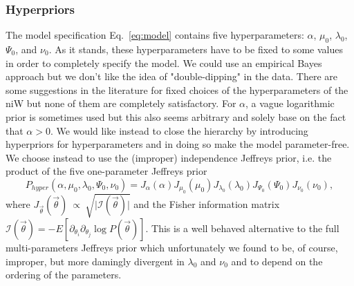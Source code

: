 \documentclass[11pt, oneside]{article}   	%
\begin{document}
\subsubsection{Hyperpriors}
The model specification Eq.~\ref{eq:model} contains five hyperparameters: $\alpha$, $\mu_0$, $\lambda_0$, $\Psi_0$, and $\nu_0$. As it stands, these hyperparameters have to be fixed to some values in order to completely specify the model. We could use an empirical Bayes approach but we don't like the idea of "double-dipping" in the data. There are some suggestions in the literature for fixed choices of the hyperparameters of the niW but none of them are completely satisfactory. For $\alpha$, a vague logarithmic prior is sometimes used but this also seems arbitrary and solely base on the fact that $\alpha > 0$. We would like instead to close the hierarchy by introducing hyperpriors for hyperparameters and in doing so make the model parameter-free. We choose instead to use the (improper) independence Jeffreys prior, i.e. the product of the five one-parameter Jeffreys prior
$$P_{hyper}(\alpha,\mu_0,\lambda_0,\Psi_0,\nu_0)=J_\alpha (\alpha) J_{\mu_0}(\mu_0) J_{\lambda_0}(\lambda_0) J_{\Psi_0}(\Psi_0) J_{\nu_0}(\nu_0),$$
where $J_{\vec \theta}(\vec \theta)~\propto~\sqrt{\vert\mathcal I(\vec \theta)\vert}$ and the Fisher information matrix $\mathcal I(\vec\theta) = -E[\partial_{\theta_i}\partial_{\theta_j} \log P(\vec\theta)]$. This is a well behaved alternative to the full multi-parameters Jeffreys prior which unfortunately we found to be, of course, improper, but more damingly divergent in $\lambda_0$ and $\nu_0$ and to depend on the ordering of the parameters.
\end{document}

